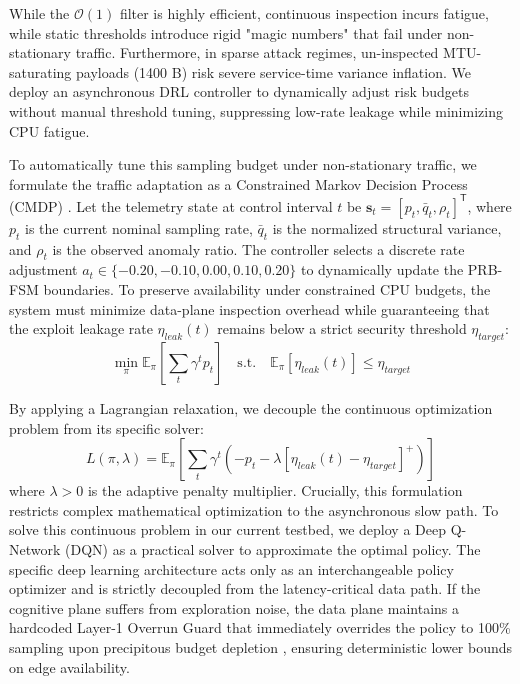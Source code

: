 \documentclass[conference]{IEEEtran}
\begin{document}
While the $\mathcal{O}(1)$ filter is highly efficient, continuous inspection incurs fatigue, while static thresholds introduce rigid "magic numbers" that fail under non-stationary traffic. Furthermore, in sparse attack regimes, un-inspected MTU-saturating payloads (1400 B) risk severe service-time variance inflation. We deploy an asynchronous DRL controller to dynamically adjust risk budgets without manual threshold tuning, suppressing low-rate leakage while minimizing CPU fatigue.

To automatically tune this sampling budget under non-stationary traffic, we formulate the traffic adaptation as a Constrained Markov Decision Process (CMDP) \cite{Altman1999_CMDP}. Let the telemetry state at control interval $t$ be $\mathbf{s}_t = [p_t, \bar{q}_t, \rho_t]^{\mathsf T}$, where $p_t$ is the current nominal sampling rate, $\bar{q}_t$ is the normalized structural variance, and $\rho_t$ is the observed anomaly ratio. The controller selects a discrete rate adjustment $a_t \in \{-0.20, -0.10, 0.00, 0.10, 0.20\}$ to dynamically update the PRB-FSM boundaries. To preserve availability under constrained CPU budgets, the system must minimize data-plane inspection overhead while guaranteeing that the exploit leakage rate $\eta_{leak}(t)$ remains below a strict security threshold $\eta_{target}$:
\begin{equation}
\min_{\pi} \mathbb{E}_{\pi} \left[ \sum_{t} \gamma^t p_t \right] \quad \text{s.t.} \quad \mathbb{E}_{\pi} \left[ \eta_{leak}(t) \right] \le \eta_{target}
\end{equation}

By applying a Lagrangian relaxation, we decouple the continuous optimization problem from its specific solver:
\begin{equation}
L(\pi, \lambda) = \mathbb{E}_{\pi} \left[ \sum_{t} \gamma^t \left( -p_t - \lambda [\eta_{leak}(t) - \eta_{target}]^+ \right) \right]
\end{equation}
where $\lambda > 0$ is the adaptive penalty multiplier. Crucially, this formulation restricts complex mathematical optimization to the asynchronous slow path. To solve this continuous problem in our current testbed, we deploy a Deep Q-Network (DQN) as a practical solver to approximate the optimal policy. The specific deep learning architecture acts only as an interchangeable policy optimizer and is strictly decoupled from the latency-critical data path. If the cognitive plane suffers from exploration noise, the data plane maintains a hardcoded Layer-1 Overrun Guard that immediately overrides the policy to 100\% sampling upon precipitous budget depletion \cite{Nygard2007}, ensuring deterministic lower bounds on edge availability.
\end{document}
